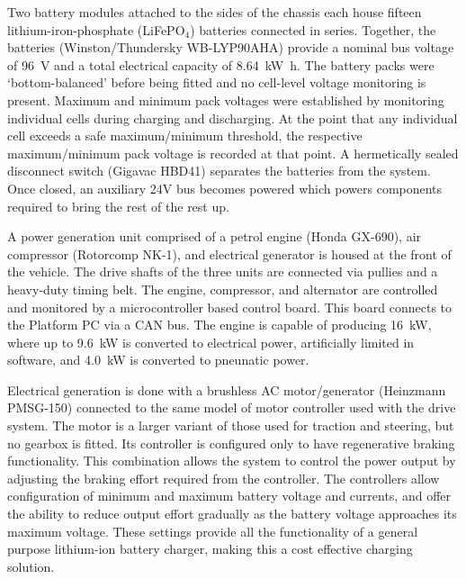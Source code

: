 \documentclass[preprint,authoryear,12pt]{elsarticle}
\begin{document}
        Two battery modules attached to the sides of the chassis each house fifteen lithium-iron-phosphate (LiFePO$_{\text{4}}$) batteries connected in series.
        Together, the batteries (Winston/Thundersky WB-LYP90AHA) provide a nominal bus voltage of \SI{96}{\volt} and a total electrical capacity of \SI{8.64}{\kilo\watt\hour}.
        The battery packs were `bottom-balanced' before being fitted and no cell-level voltage monitoring is present.
        Maximum and minimum pack voltages were established by monitoring individual cells during charging and discharging.
        At the point that any individual cell exceeds a safe maximum/minimum threshold, the respective maximum/minimum pack voltage is recorded at that point.
        A hermetically sealed disconnect switch (Gigavac HBD41) separates the batteries from the system.
        Once closed, an auxiliary 24V bus becomes powered which powers components required to bring the rest of the rest up.

        A power generation unit comprised of a petrol engine (Honda GX-690), air compressor (Rotorcomp NK-1), and electrical generator is housed at the front of the vehicle.
        The drive shafts of the three units are connected via pullies and a heavy-duty timing belt.
        The engine, compressor, and alternator are controlled and monitored by a microcontroller based control board.
        This board connects to the Platform PC via a CAN bus.
        The engine is capable of producing \SI{16}{\kilo\watt}, where up to \SI{9.6}{\kilo\watt} is converted to electrical power, artificially limited in software, and \SI{4.0}{\kilo\watt} is converted to pneunatic power.

        Electrical generation is done with a brushless AC motor/generator (Heinzmann PMSG-150) connected to the same model of motor controller used with the drive system.
        The motor is a larger variant of those used for traction and steering, but no gearbox is fitted.
        Its controller is configured only to have regenerative braking functionality.
        This combination allows the system to control the power output by adjusting the braking effort required from the controller.
        The controllers allow configuration of minimum and maximum battery voltage and currents, and offer the ability to reduce output effort gradually as the battery voltage approaches its maximum voltage.
        These settings provide all the functionality of a general purpose lithium-ion battery charger, making this a cost effective charging solution.
\end{document}
